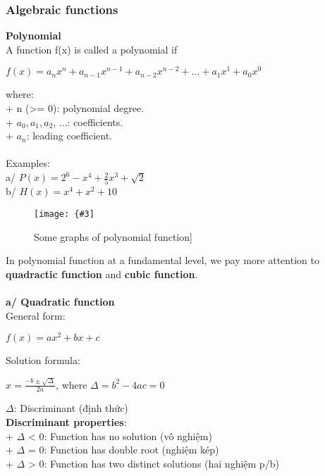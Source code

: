 \documentclass[12pt,a4paper]{article}
\newcommand{\img}[3]{
	\texttt{[image: \{\#3]}}}
\newcommand{\superscript}[1]{^{{#1}}}
\newcommand{\subscript}[1]{_{{#1}}}
\begin{document}
\subsubsection{Algebraic functions}
{\Large \textbf{Polynomial}}\\
A function f(x) is called a polynomial if
\begin{center}
$f(x) = a\subscript{n}x\superscript{n} + a\subscript{n-1}x\superscript{n-1} + a\subscript{n-2}x\superscript{n-2} + ... + a\subscript{1}x\superscript{1} + a\subscript{0}x\superscript{0}$
\end{center}
where:\\
+ n (>= 0): polynomial degree.\\
+ $a\subscript{0}, a\subscript{1}, a\subscript{2}$, ...: coefficients.\\
+ $a\subscript{n}$: leading coefficient.\\ \\ \noindent
Examples:\\
a/ $P(x) = 2\superscript{6} - x\superscript{4} + \frac{2}{5}x\superscript{3} + \sqrt{2}$\\
b/ $H(x) = x\superscript{4} + x\superscript{2} + 10$\\
\begin{figure}[h!]
\centering\img{7cm}{2cm}{Picture/Univariate_calculus/Categories/1.png}
\caption{Some graphs of polynomial function]}
\end{figure}
\newline
\noindent In polynomial function at a fundamental level, we pay more attention to \textbf{quadractic function} and \textbf{cubic function}.\\ \\ \noindent
\textbf{a/ Quadratic function}\\
General form:
\begin{center}
$f(x) = ax\superscript{2} + bx + c$
\end{center}
Solution formula:
\begin{center}
	$x = \frac{-b \pm \sqrt{\Delta}}{2a}$, where
	$\Delta = b\superscript{2} - 4ac = 0$
\end{center}
$\Delta$: Discriminant (định thức)\\
\textbf{Discriminant properties}:\\
+ $\Delta$ < 0: Function has no solution (vô nghiệm)\\
+ $\Delta$ = 0: Function has double root (nghiệm kép)\\
+ $\Delta$ > 0: Function has two distinct solutions (hai nghiệm p/b)\\ \\ \noindent
\end{document}
